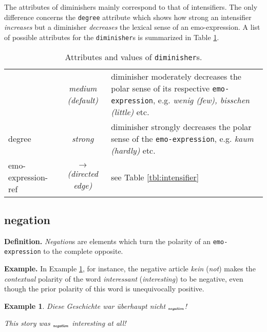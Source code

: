\documentclass[11pt,a4paper]{article}
\newlength{\clmnwidth}
\theoremstyle{mytheoremstyle}
\newtheorem{exmp}{Example}[section]
\newcommand{\mtag}[2]{{\upshape[\emph{#2}\upshape]$_{\textrm{\bfseries\emph{\tiny
        #1}}}$}}
\newcommand{\negation}[2][]{\mtag{ne\-ga\-tion\ifstrempty{#1}{}{:#1}}{#2}}
\begin{document}
The attributes of diminishers mainly correspond to that of
intensifiers.  The only difference concerns the \texttt{degree}
attribute which shows how strong an intensifier \emph{increases} but a
diminisher \emph{decreases} the lexical sense of an emo-expression.  A
list of possible attributes for the \texttt{diminisher}s is summarized
in Table \ref{tbl:diminisher}.
\begin{center}
  \begin{table}[hb]
    \caption{Attributes and values of \texttt{diminisher}s.}
    \begin{tabular}{|l|c|p{0.88\clmnwidth}|}\hline

      & \textit{medium (default)} & diminisher moderately decreases
      the polar sense of its respective \texttt{emo-expression},
      e.g. \textit{wenig (few), bisschen (little)} etc.\\\cline{2-3}

      \multirow{-2}{*}{degree} & \textit{strong} & diminisher strongly
      decreases the polar sense of the \texttt{emo-expression},
      e.g. \textit{kaum (hardly)} etc.\\\hline

      emo-expression-ref & \textit{$\longrightarrow$\newline(directed
        edge)} & see Table \ref{tbl:intensifier}\\\hline
    \end{tabular}
    \label{tbl:diminisher}
  \end{table}
\end{center}

\subsection{negation}
\noindent\textbf{Definition.} \emph{Negation}s are elements which turn
the polarity of an \texttt{emo-expression} to the complete opposite.

\noindent\textbf{Example.} In Example \ref{exmp:negation}, for
instance, the negative article \textit{kein} (\textit{not}) makes the
\emph{contextual} polarity of the word \textit{interessant}
(\textit{interesting}) to be negative, even though the prior polarity
of this word is unequivocally positive.
\begin{exmp}
Diese Geschichte war \"uberhaupt nicht \negation{interessant}!

This story was \negation{not} interesting at all!\label{exmp:negation}
\end{exmp}
\end{document}
